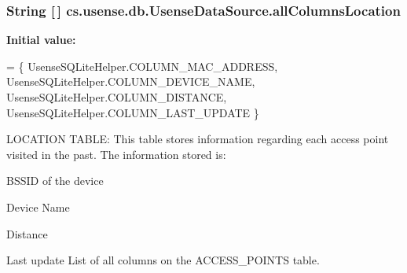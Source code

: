 \subsubsection[{all\+Columns\+Location}]{\setlength{\rightskip}{0pt plus 5cm}String \mbox{[}$\,$\mbox{]} cs.\+usense.\+db.\+Usense\+Data\+Source.\+all\+Columns\+Location\hspace{0.3cm}{\ttfamily [private]}}\label{classcs_1_1usense_1_1db_1_1_usense_data_source_a95178df715a8c412f84764ab9be54d81}
{\bfseries Initial value\+:}
\begin{DoxyCode}
= \{ 
            UsenseSQLiteHelper.COLUMN\_MAC\_ADDRESS,
            UsenseSQLiteHelper.COLUMN\_DEVICE\_NAME,
            UsenseSQLiteHelper.COLUMN\_DISTANCE,
            UsenseSQLiteHelper.COLUMN\_LAST\_UPDATE
    \}
\end{DoxyCode}
L\+O\+C\+A\+T\+I\+O\+N T\+A\+B\+L\+E\+: This table stores information regarding each access point visited in the past. The information stored is\+:
\begin{DoxyItemize}
\item B\+S\+S\+I\+D of the device
\item Device Name
\end{DoxyItemize}

Distance
\begin{DoxyItemize}
\item Last update List of all columns on the A\+C\+C\+E\+S\+S\+\_\+\+P\+O\+I\+N\+T\+S table. 
\end{DoxyItemize}\hypertarget{classcs_1_1usense_1_1db_1_1_usense_data_source_a974d57d1a21d3d3d4769d6ad8be5d15e}{}
